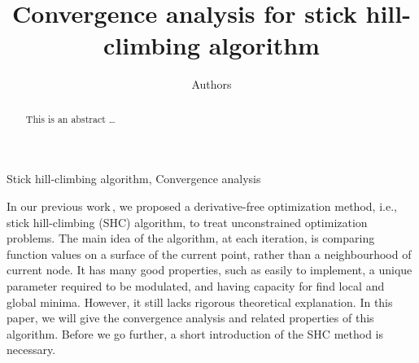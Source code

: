\documentclass[preprint,12pt]{elsarticle}
\begin{document}
\begin{frontmatter}

\title{ Convergence analysis for stick hill-climbing algorithm}


\author{Authors }


%

\begin{abstract}
This is an abstract \dots
\end{abstract}

\begin{keyword}
Stick hill-climbing algorithm, Convergence analysis
\end{keyword}

\end{frontmatter}



In our previous work\,\cite{huang2017hill}, we proposed a derivative-free
optimization method, i.e., stick hill-climbing (SHC) algorithm, to
treat unconstrained optimization problems. 
The main idea of the algorithm, at each iteration, is
comparing function values on a surface of the current point,
rather than a neighbourhood of current node. 
It has many good properties, such as easily to implement,
a unique parameter required to be modulated, and having capacity
for find local and global minima. However, it still lacks rigorous
theoretical explanation. 
In this paper, we will give the convergence analysis and related
properties of this algorithm.
Before we go further, a short introduction of the
SHC method is necessary.
\end{document}
